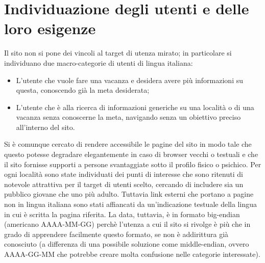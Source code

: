 \section{Individuazione degli utenti e delle loro esigenze}\label{sec:requisiti}
Il sito non si pone dei vincoli al target di utenza mirato; in particolare si individuano due macro-categorie di utenti di lingua italiana:
\begin{itemize}
\item L'utente che vuole fare una vacanza e desidera avere più informazioni su
questa, conoscendo già la meta desiderata;
\item L'utente che è alla ricerca di informazioni generiche su una località o
di una vacanza senza conoscerne la meta, navigando senza un obiettivo preciso
all'interno del sito.
\end{itemize}
Si è comunque cercato di rendere accessibile le pagine del sito in modo tale
che questo potesse degradare elegantemente in caso di browser vecchi o testuali
e che il sito fornisse supporti a persone svantaggiate sotto il profilo fisico
o psichico.
Per ogni località sono state individuati dei punti di interesse che sono
ritenuti di notevole attrattiva per il target di utenti scelto, cercando di
includere sia un pubblico giovane che uno più adulto. Tuttavia link esterni che
portano a pagine non in lingua italiana sono stati affiancati da un'indicazione
testuale della lingua in cui è scritta la pagina riferita.
La data, tuttavia, è in formato big-endian (americano AAAA-MM-GG) perchè
l'utenza a cui il sito si rivolge è più che in grado di apprendere facilmente
questo formato, se non è addirittura già conosciuto (a differenza di una
possibile soluzione come middle-endian, ovvero AAAA-GG-MM che potrebbe creare
molta confusione nelle categorie interessate).
